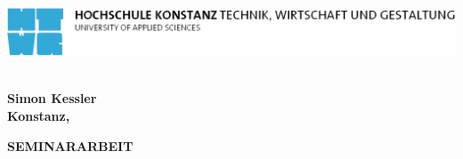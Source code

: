 \begin{titlepage}

\vspace*{-2cm}

\begin{flushleft}
\hspace*{-1cm} \includegraphics[width=15.7cm]{htwg-logo}
\end{flushleft}

\vspace{2.5cm}

\begin{center}
	\huge{
		\textbf{\sf \thema} \\[5cm]
	}
	\Large{
		\textbf{\sf Simon Kessler}} \\[6.5cm]
	\large{
		\textbf{\sf Konstanz, \abgabedatum} \\[2.3cm]
	}
	
	\Huge{
		\textbf{{\sf SEMINARARBEIT}}
	}
\end{center}

\end{titlepage}